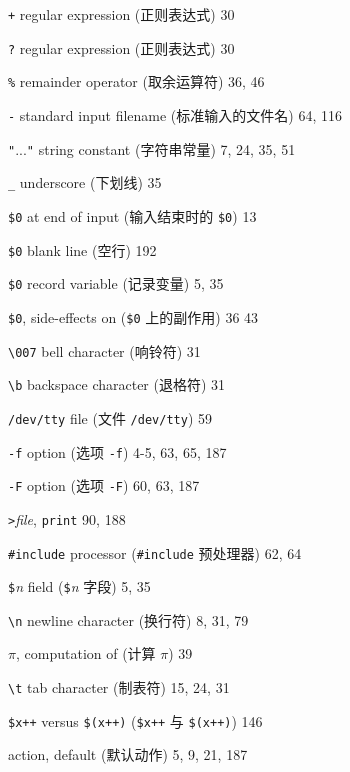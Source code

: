 \begin{multicols}{2}
\hangindent=2pc  \verb'+' regular expression (正则表达式) 30

\hangindent=2pc  \verb'?' regular expression (正则表达式) 30

\hangindent=2pc  \verb'%' remainder operator (取余运算符) 36, 46

\hangindent=2pc  \verb'-' standard input filename
(标准输入的文件名) 64, 116

\hangindent=2pc  \verb'"'...\verb'"' string constant
(字符串常量) 7, 24, 35, 51

\hangindent=2pc  \verb'_' underscore (下划线) 35

\hangindent=2pc  \verb'$0' at end of input (输入结束时的
\verb'$0') 13

\hangindent=2pc  \verb'$0' blank line (空行) 192

\hangindent=2pc  \verb'$0' record variable (记录变量) 5, 35

\hangindent=2pc  \verb'$0', side-effects on (\verb'$0' 上的副作用)
36 43

\hangindent=2pc  \verb'\007' bell character (响铃符) 31

\hangindent=2pc  \verb'\b' backspace character (退格符) 31

\hangindent=2pc  \verb'/dev/tty' file (文件 \verb'/dev/tty') 59

\hangindent=2pc  \verb'-f' option (选项 \verb'-f') 4-5, 63, 65, 187

\hangindent=2pc  \verb'-F' option (选项 \verb'-F') 60, 63, 187

\hangindent=2pc  \verb'>'\textit{file}, \verb'print' 90, 188

\hangindent=2pc  \verb'#include' processor (\verb'#include'
预处理器) 62, 64

\hangindent=2pc  \verb'$'\textit{n} field (\verb'$'\textit{n}
字段) 5, 35

\hangindent=2pc  \verb'\n' newline character (换行符) 8, 31, 79

\hangindent=2pc  $\pi$, computation of (计算 $\pi$) 39

\hangindent=2pc  \verb'\t' tab character (制表符) 15, 24, 31

\hangindent=2pc  \verb'$x++' versus \verb'$(x++)' (\verb'$x++'
与 \verb'$(x++)') 146

\hangindent=2pc  action, default (默认动作) 5, 9, 21, 187


\end{multicols}
